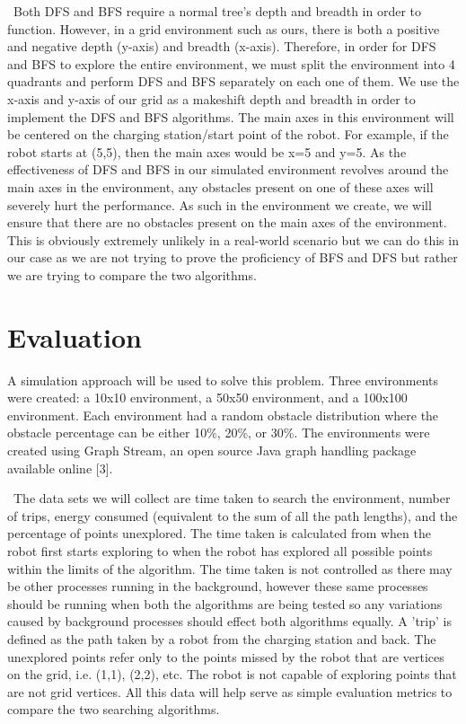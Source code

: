 \documentclass[conference]{IEEEtran}
\begin{document}
\
Both DFS and BFS require a normal tree's depth and breadth in order to function. However, in a grid environment such as ours, there is both a positive and negative depth (y-axis) and breadth (x-axis). Therefore, in order for DFS and BFS to explore the entire environment, we must split the environment into 4 quadrants and perform DFS and BFS separately on each one of them. We use the x-axis and y-axis of our grid as a makeshift depth and breadth in order to implement the DFS and BFS algorithms. The main axes in this environment will be centered on the charging station/start point of the robot. For example, if the robot starts at (5,5), then the main axes would be x=5 and y=5. As the effectiveness of DFS and BFS in our simulated environment revolves around the main axes in the environment, any obstacles present on one of these axes will severely hurt the performance. As such in the environment we create, we will ensure that there are no obstacles present on the main axes of the environment. This is obviously extremely unlikely in a real-world scenario but we can do this in our case as we are not trying to prove the proficiency of BFS and DFS but rather we are trying to compare the two algorithms.

\section{Evaluation}
A simulation approach will be used to solve this problem. Three environments were created: a 10x10 environment, a 50x50 environment, and a 100x100 environment. Each environment had a random obstacle distribution where the obstacle percentage can be either 10\%, 20\%, or 30\%. The environments were created using Graph Stream, an open source Java graph handling package available online [3]. 

\
The data sets we will collect are time taken to search the environment, number of trips, energy consumed (equivalent to the sum of all the path lengths), and the percentage of points unexplored. The time taken is calculated from when the robot first starts exploring to when the robot has explored all possible points within the limits of the algorithm. The time taken is not controlled as there may be other processes running in the background, however these same processes should be running when both the algorithms are being tested so any variations caused by background processes should effect both algorithms equally. A 'trip' is defined as the path taken by a robot from the charging station and back. The unexplored points refer only to the points missed by the robot that are vertices on the grid, i.e. (1,1), (2,2), etc. The robot is not capable of exploring points that are not grid vertices. All this data will help serve as simple evaluation metrics to compare the two searching algorithms.
\end{document}
